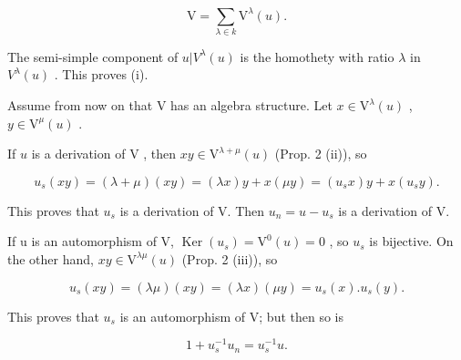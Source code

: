 \[
\mathrm{V} = \sum_ {\lambda \in k} \mathrm{V} ^ {\lambda} (u).
\]

The semi-simple component of \(u|V^{\lambda}(u)\) is the homothety with ratio \(\lambda\) in \(V^{\lambda}(u)\) . This proves (i).

Assume from now on that \(\mathrm{V}\) has an algebra structure. Let \(x \in \mathrm{V}^{\lambda}(u)\) , \(y \in \mathrm{V}^{\mu}(u)\) .

If \(u\) is a derivation of \(\mathrm{V}\) , then \(xy \in \mathrm{V}^{\lambda + \mu}(u)\) (Prop. 2 (ii)), so

\[
u _ {s} (x y) = (\lambda + \mu) (x y) = (\lambda x) y + x (\mu y) = (u _ {s} x) y + x (u _ {s} y).
\]

This proves that \(u_{s}\) is a derivation of V. Then \(u_{n} = u - u_{s}\) is a derivation of V.

If u is an automorphism of V, \(\operatorname{Ker}(u_{s}) = \mathrm{V}^{0}(u) = 0\) , so \(u_{s}\) is bijective. On the other hand, \(xy \in \mathrm{V}^{\lambda\mu}(u)\) (Prop. 2 (iii)), so

\[
u _ {s} (x y) = (\lambda \mu) (x y) = (\lambda x) (\mu y) = u _ {s} (x). u _ {s} (y).
\]

This proves that \(u_{s}\) is an automorphism of V; but then so is

\[
1 + u _ {s} ^ {- 1} u _ {n} = u _ {s} ^ {- 1} u.
\]

